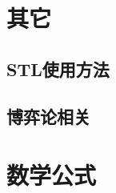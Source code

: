 \documentclass[openany, a4paper, 10pt]{book}
\begin{document}
\begin{spacing}{1.0}
	\chapter{其它}
		\section{STL使用方法}
			
		\section{博弈论相关}
			
	\chapter{数学公式}
		
	\end{spacing}
\end{document}
